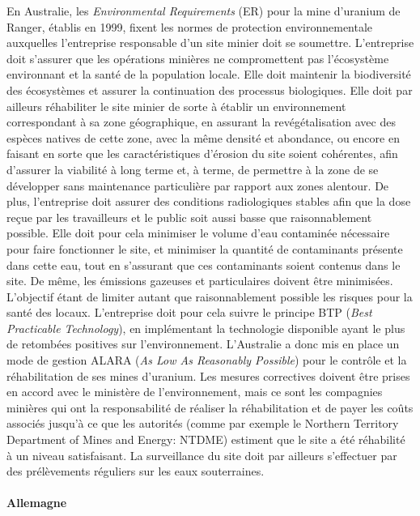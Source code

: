 \documentclass{article}
\begin{document}
En Australie, les \textit{Environmental Requirements} (ER) pour la mine d’uranium de Ranger, établis en 1999, fixent les normes de protection environnementale auxquelles l’entreprise responsable d’un site minier doit se soumettre. L’entreprise doit s’assurer que les opérations minières ne compromettent pas l’écosystème environnant et la santé de la population locale. Elle doit maintenir la biodiversité des écosystèmes et assurer la continuation des processus biologiques. Elle doit par ailleurs réhabiliter le site minier de sorte à établir un environnement correspondant à sa zone géographique, en assurant la revégétalisation avec des espèces natives de cette zone, avec la même densité et abondance, ou encore en faisant en sorte que les caractéristiques d’érosion du site soient cohérentes, afin d’assurer la viabilité à long terme et, à terme, de permettre à la zone de se développer sans maintenance particulière par rapport aux zones alentour. De plus, l’entreprise doit assurer des conditions radiologiques stables afin que la dose reçue par les travailleurs et le public soit aussi basse que raisonnablement possible. Elle doit pour cela minimiser le volume d’eau contaminée nécessaire pour faire fonctionner le site, et minimiser la quantité de contaminants présente dans cette eau, tout en s’assurant que ces contaminants soient contenus dans le site. De même, les émissions gazeuses et particulaires doivent être minimisées. L’objectif étant de limiter autant que raisonnablement possible les risques pour la santé des locaux. L’entreprise doit pour cela suivre le principe BTP (\textit{Best Practicable Technology}), en implémentant la technologie disponible ayant le plus de retombées positives sur l’environnement. L’Australie a donc mis en place un mode de gestion ALARA (\textit{As Low As Reasonably Possible}) pour le contrôle et la réhabilitation de ses mines d’uranium.
Les mesures correctives doivent être prises en accord avec le ministère de l’environnement, mais ce sont les compagnies minières qui ont la responsabilité de réaliser la réhabilitation et de payer les coûts associés jusqu’à ce que les autorités (comme par exemple le Northern Territory Department of Mines and Energy: NTDME) estiment que le site a été réhabilité à un niveau satisfaisant. La surveillance du site doit par ailleurs s’effectuer par des prélèvements réguliers sur les eaux souterraines.

\paragraph{Allemagne}
\end{document}
